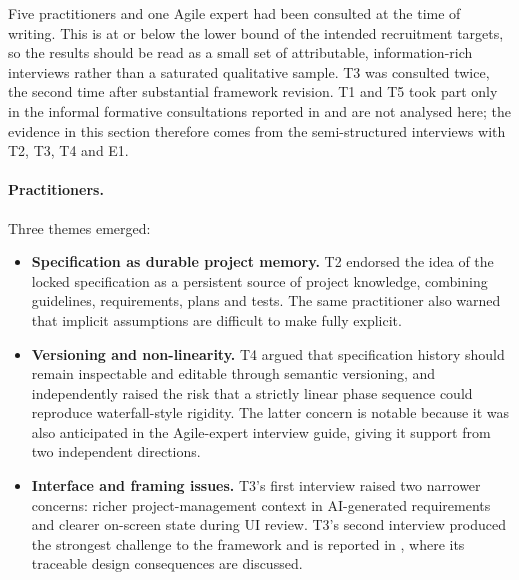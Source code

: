 Five practitioners and one Agile expert had been consulted at the time of writing. This is at or below the lower bound of the intended recruitment targets, so the results should be read as a small set of attributable, information-rich interviews rather than a saturated qualitative sample. T3 was consulted twice, the second time after substantial framework revision. T1 and T5 took part only in the informal formative consultations reported in  and are not analysed here; the evidence in this section therefore comes from the semi-structured interviews with T2, T3, T4 and E1.

\paragraph{Practitioners.} Three themes emerged:

\begin{itemize}[leftmargin=0.6cm, itemsep=0.3em, topsep=0.2em]

\item \textbf{Specification as durable project memory.} T2 endorsed the idea of the locked specification as a persistent source of project knowledge, combining guidelines, requirements, plans and tests. The same practitioner also warned that implicit assumptions are difficult to make fully explicit.

\item \textbf{Versioning and non-linearity.} T4 argued that specification history should remain inspectable and editable through semantic versioning, and independently raised the risk that a strictly linear phase sequence could reproduce waterfall-style rigidity. The latter concern is notable because it was also anticipated in the Agile-expert interview guide, giving it support from two independent directions.

\item \textbf{Interface and framing issues.} T3's first interview raised two narrower concerns: richer project-management context in AI-generated requirements and clearer on-screen state during UI review. T3's second interview produced the strongest challenge to the framework and is reported in , where its traceable design consequences are discussed.

\end{itemize}

